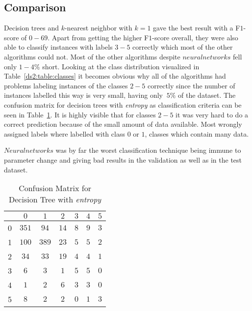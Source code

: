 \subsection{Comparison}
Decision trees and $k$-nearest neighbor with $k=1$ gave the best result with a F$1$-score of $0-69$. Apart from getting the higher F$1$-score overall, they were also able to classify instances with labels $3-5$ correctly which most of the other algorithms could not. Most of the other algorithms despite $neural networks$ fell only	$1-4\%$ short.
Looking at the class distribution visualized in Table~\ref{ds2:table:classes} it becomes obvious why all of the algorithms had problems labeling instances of the classes $2-5$ correctly since the number of instances labelled this way is very small, having only $~5\%$ of the dataset. The confusion matrix for decision trees with \textit{entropy} as classification criteria can be seen in Table~\ref{ds2:confmatrix}. It is highly visible that for classes $2-5$ it was very hard to do a correct prediction because of the small amount of data available. Most wrongly assigned labels where labelled with class $0$ or $1$, classes which contain many data.
\par $Neural networks$ was by far the worst classification technique being immune to parameter change and giving bad results in the validation as well as in the test dataset.

\begin{table}[p]
	\begin{center}
		\begin{tabular}{|c|c|c|c|c|c|c|}
		\hline	\backslashbox{Class}{Predicted} & $0$ & $1$ & $2$ & $3$ & $4$ & $5$ \\
		\hline  0 & $351$ & $94$ & $14$ & $8$ & $9$ & $3$ \\
		\hline  1 & $100$ & $389$ & $23$ & $5$ & $5$ & $2$ \\
		\hline  2 & $34$  & $33$ & $19$ & $4$ & $4$ & $1$ \\
		\hline  3 & $6$   & $3$ & $1$ & $5$ & $5$ & $0$ \\
		\hline  4 & $1$   & $2$ & $6$ & $3$ & $3$ & $0$ \\
		\hline  5 & $8$   & $2$ & $2$ & $0$ & $1$ & $3$ \\
		\end{tabular}
	\end{center}
		\caption{Confusion Matrix for Decision Tree with \textit{entropy}\label{ds2:confmatrix}}
\end{table}
\label{ds2:sec:comparison}
